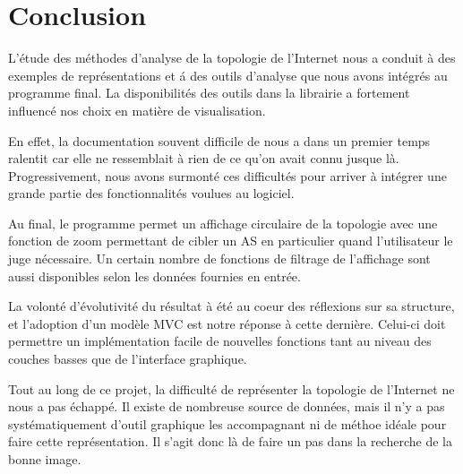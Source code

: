 \section*{Conclusion}

\par
L'\'etude des m\'ethodes d'analyse de la topologie de l'Internet nous a conduit \`a des exemples de repr\'esentations et \'a des outils d'analyse que nous avons int\'egr\'es au programme final.
La  disponibilit\'es des outils dans la librairie \boost a fortement influenc\'e nos choix en mati\`ere de visualisation.

En effet, la documentation souvent difficile de \boost nous a dans un premier temps ralentit car elle ne ressemblait \`a rien de ce qu'on avait connu jusque l\`a. Progressivement, nous avons surmont\'e ces difficult\'es pour arriver \`a int\'egrer une grande partie des fonctionnalit\'es voulues au logiciel.

Au final, le programme permet un affichage circulaire de la topologie avec une fonction de zoom permettant de cibler un AS en particulier quand l'utilisateur le juge n\'ecessaire. Un certain nombre de fonctions de filtrage de l'affichage sont aussi disponibles selon les donn\'ees fournies en entr\'ee.

La volont\'e d'\'evolutivit\'e du r\'esultat \`a \'et\'e au coeur des r\'eflexions sur sa structure, et l'adoption d'un mod\`ele MVC est notre r\'eponse \`a cette derni\`ere. Celui-ci doit permettre un impl\'ementation facile de nouvelles fonctions tant au niveau des couches basses que de l'interface graphique.

Tout au long de ce projet, la difficult\'e de repr\'esenter la topologie de l'Internet ne nous a pas \'echapp\'e. Il existe de nombreuse source de donn\'ees, mais il n'y a pas syst\'ematiquement d'outil graphique les accompagnant ni de m\'ethoe id\'eale pour faire cette repr\'esentation. Il s'agit donc l\`a de faire un pas dans la recherche de la bonne image.